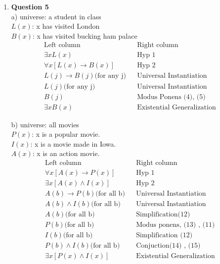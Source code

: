 \documentclass[12pt]{article}
\begin{document}
\begin{enumerate}
\item {\bf{Question 5}} \\
a) universe: a student in class \\
$L(x)$: x has visited London \\
$B(x)$: x has visited bucking ham palace \\
\begin{align}
\textrm{Left column} && \textrm{Right column} \\
      \exists xL(x) && \textrm{Hyp 1} \\
  	  \forall x[L(x) \rightarrow B(x)] && \textrm{Hyp 2} \\
      L(j) \rightarrow B(j) \textrm{(for any j)} && \textrm{Universal Instantiation} \\
      L(j) \textrm{(for any j)} && \textrm{Universal Instantiation} \\
      B(j) &&  \textrm{Modus Ponens (4), (5)} \\
      \exists xB(x) && \textrm{Existential Generalization} 
\end{align}

b)
universe: all movies \\
$P(x)$: x is a popular movie. \\ 
$I(x)$: x is a movie made in Iowa. \\
$A(x)$: x is an action movie. \\
\begin{align}
\textrm{Left column} && \textrm{Right column} \\
      \forall x[A(x) \rightarrow P(x)] && \textrm{Hyp 1} \\
  	  \exists x [A(x) \land I(x)] && \textrm{Hyp 2} \\
      A(b) \rightarrow P(b) \textrm{(for all b)} && \textrm{Universal Instantiation} \\
      A(b) \land I(b) \textrm{(for all b)} && \textrm{Universal Instantiation} \\
      A(b) \textrm{(for all b)} &&  \textrm{Simplification(12)} \\
      P(b) \textrm{(for all b)} && \textrm{Modus ponens, (13) , (11)} \\ 
      I(b) \textrm{(for all b)} && \textrm{Simplification (12)} \\
      P(b) \land I(b) \textrm{(for all b)} && \textrm{Conjuction(14) , (15)} \\
      \exists x[P(x) \land I(x)] && \textrm{Existential Generalization} 
\end{align}



\end{enumerate}
\end{document}
